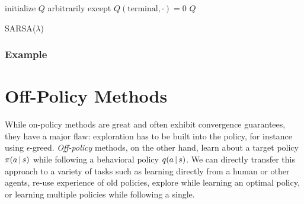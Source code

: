 				\begin{algorithm}  \DontPrintSemicolon
					initialize \(Q\) arbitrarily except \(Q(\mathrm{terminal}, \cdot) = 0\) \;
					\Return \(Q\) \;
					\caption{\acs{SARSA}(\(\lambda\))}
					\label{alg:sarsaLambda}
				\end{algorithm}

			\subsubsection{Example} %

	\section{Off-Policy Methods}
		While on-policy methods are great and often exhibit convergence guarantees, they have a major flaw: exploration has to be built into the policy, for instance using \(\epsilon\)-greed. \emph{Off-policy} methods, on the other hand, learn about a target policy \(\pi(a \,\vert\, s)\) while following a behavioral policy \(q(a \,\vert\, s)\). We can directly transfer this approach to a variety of tasks such as learning directly from a human or other agents, re-use experience of old policies, explore while learning an optimal policy, or learning multiple policies while following a single.

